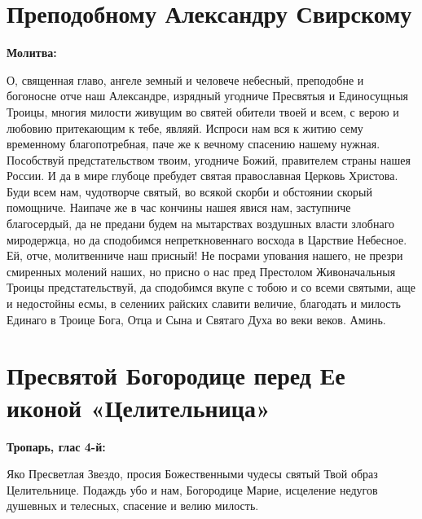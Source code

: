 
 

\section{Преподобному Александру Свирскому}
 
\bfseries Молитва:\normalfont{}


О, священная главо, ангеле земный и человече небесный, преподобне и богоносне отче наш Александре, изрядный угодниче Пресвятыя и Единосущныя Троицы, многия милости живущим во святей обители твоей и всем, с верою и любовию притекающим к тебе, являяй. Испроси нам вся к житию сему временному благопотребная, паче же к вечному спасению нашему нужная. Пособствуй предстательством твоим, угодниче Божий, правителем страны нашея России. И да в мире глубоце пребудет святая православная Церковь Христова. Буди всем нам, чудотворче святый, во всякой скорби и обстоянии скорый помощниче. Наипаче же в час кончины нашея явися нам, заступниче благосердый, да не предани будем на мытарствах воздушных власти злобнаго миродержца, но да сподобимся непреткновеннаго восхода в Царствие Небесное. Ей, отче, молитвенниче наш присный! Не посрами упования нашего, не презри смиренных молений наших, но присно о нас пред Престолом Живоначальныя Троицы предстательствуй, да сподобимся вкупе с тобою и со всеми святыми, аще и недостойны есмы, в селениих райских славити величие, благодать и милость Единаго в Троице Бога, Отца и Сына и Святаго Духа во веки веков. Аминь.


 

\section{Пресвятой Богородице перед Ее иконой «Целительница»}
 


\bfseries Тропарь, глас 4-й:\normalfont{}


Яко Пресветлая Звездо, просия Божественными чудесы святый Твой образ Целительнице. Подаждь убо и нам, Богородице Марие, исцеление недугов душевных и телесных, спасение и велию милость.


